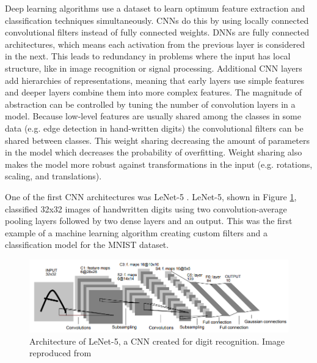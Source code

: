 Deep learning algorithms use a dataset to learn optimum feature extraction and classification techniques simultaneously. CNNs do this by using locally connected convolutional filters instead of fully connected weights. DNNs are fully connected architectures, which means each activation from the previous layer is considered in the next. This leads to redundancy in problems where the input has local structure, like in image recognition or signal processing. Additional CNN layers add hierarchies of representations, meaning that early layers use simple features and deeper layers combine them into more complex features. The magnitude of abstraction can be controlled by tuning the number of convolution layers in a model. Because low-level features are usually shared among the classes in some data (e.g. edge detection in hand-written digits) the convolutional filters can be shared between classes. This weight sharing decreasing the amount of parameters in the model which decreases the probability of overfitting. Weight sharing also makes the model more robust against transformations in the input (e.g. rotations, scaling, and translations).

One of the first CNN architectures was LeNet-5 \cite{Lecun1998}. LeNet-5, shown in Figure \ref{fig:cnn_mnist_lecun98}, classified 32x32 images of handwritten digits using two convolution-average pooling layers followed by two dense layers and an output. This was the first example of a machine learning algorithm creating custom filters and a classification model for the MNIST dataset.



\begin{figure}[H]
	\centering
	\includegraphics[width=0.85\linewidth]{images/cnn_mnist_lecun98}
	\caption{Architecture of LeNet-5, a CNN created for digit recognition. Image reproduced from \cite{Lecun1998}}
	\label{fig:cnn_mnist_lecun98}
\end{figure}

